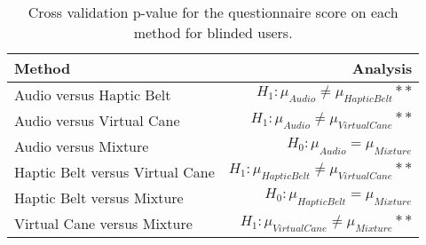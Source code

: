 
\begin{table}[!htb]
\centering
\caption{Cross validation p-value for the questionnaire score on each method for blinded users.}
\label{tab:lsd_questionnaire}
\begin{tabular}{lr}
\toprule
                         Method &                                           Analysis \\
\midrule
       Audio versus Haptic Belt &        $H_1 : \mu_{Audio} \ne \mu_{Haptic Belt}**$ \\
      Audio versus Virtual Cane &       $H_1 : \mu_{Audio} \ne \mu_{Virtual Cane}**$ \\
           Audio versus Mixture &                $H_0 : \mu_{Audio} = \mu_{Mixture}$ \\
Haptic Belt versus Virtual Cane & $H_1 : \mu_{Haptic Belt} \ne \mu_{Virtual Cane}**$ \\
     Haptic Belt versus Mixture &          $H_0 : \mu_{Haptic Belt} = \mu_{Mixture}$ \\
    Virtual Cane versus Mixture &     $H_1 : \mu_{Virtual Cane} \ne \mu_{Mixture}**$ \\
\bottomrule
\end{tabular}
\end{table}

